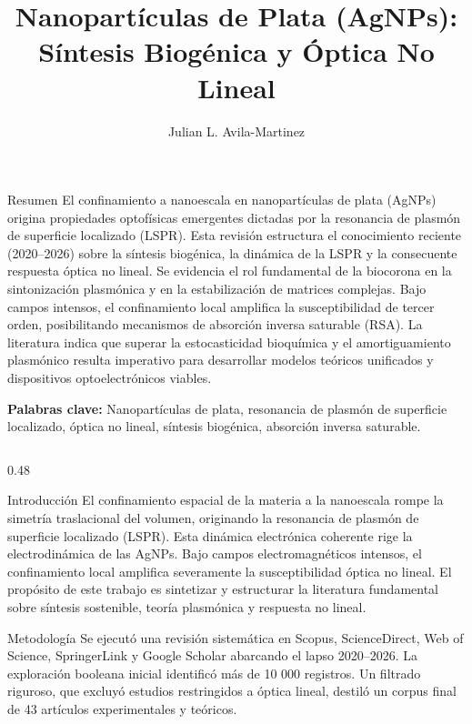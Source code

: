 \documentclass[final]{beamer}
\title{Nanopartículas de Plata (AgNPs): \\ Síntesis Biogénica y Óptica No Lineal}
\author{Julian L. Avila-Martinez}
\institute{Física - Universidad Distrital Francisco Jose de Caldas}
\begin{document}
\begin{frame}[t]

  \begin{block}{Resumen}
    El confinamiento a nanoescala en nanopartículas de plata (AgNPs) origina
    propiedades optofísicas emergentes dictadas por la resonancia de plasmón de
    superficie localizado (LSPR). Esta revisión estructura el conocimiento
    reciente (2020--2026) sobre la síntesis biogénica, la dinámica de la LSPR y
    la consecuente respuesta óptica no lineal. Se evidencia el rol fundamental
    de la biocorona en la sintonización plasmónica y en la estabilización de
    matrices complejas. Bajo campos intensos, el confinamiento local amplifica
    la susceptibilidad de tercer orden, posibilitando mecanismos de absorción
    inversa saturable (RSA). La literatura indica que superar la estocasticidad
    bioquímica y el amortiguamiento plasmónico resulta imperativo para
    desarrollar modelos teóricos unificados y dispositivos optoelectrónicos
    viables.

    \smallskip
    \textbf{Palabras clave:} Nanopartículas de plata, resonancia de plasmón
    de superficie localizado, óptica no lineal, síntesis biogénica,
    absorción inversa saturable.
  \end{block}

  \vspace{-1.cm}

  \begin{columns}[t]
    \begin{column}{0.48\textwidth}

      \begin{block}{Introducción}
        El confinamiento espacial de la materia a la nanoescala rompe la
        simetría traslacional del volumen, originando la resonancia de plasmón
        de superficie localizado (LSPR). Esta dinámica electrónica coherente
        rige la electrodinámica de las AgNPs. Bajo campos electromagnéticos
        intensos, el confinamiento local amplifica severamente la
        susceptibilidad óptica no lineal. El propósito de este trabajo es
        sintetizar y estructurar la literatura fundamental sobre síntesis
        sostenible, teoría plasmónica y respuesta no lineal.
      \end{block}

      \begin{block}{Metodología}
        Se ejecutó una revisión sistemática en Scopus, ScienceDirect, Web of
        Science, SpringerLink y Google Scholar abarcando el lapso 2020--2026.
        La exploración booleana inicial identificó más de 10 000 registros. Un
        filtrado riguroso, que excluyó estudios restringidos a óptica lineal,
        destiló un corpus final de 43 artículos experimentales y teóricos.
      \end{block}


\end{column}
\end{columns}
\end{frame}
\end{document}
